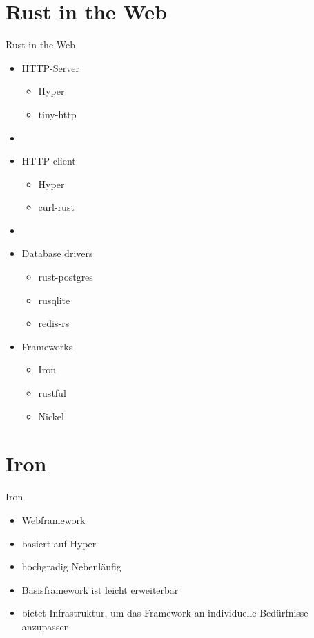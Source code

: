 \documentclass{beamer}
\begin{document}
\section{Rust in the Web}

\begin{frame}{Rust in the Web}

\begin{minipage}[t]{.45\textwidth}
\begin{itemize}
  \item HTTP-Server
  \begin{itemize}
    \item Hyper
    \item tiny-http
  \end{itemize}
  \item []
  \item HTTP client
  \begin{itemize}
    \item Hyper
    \item curl-rust
  \end{itemize} 
  \item []
  \item Database drivers
  \begin{itemize}
    \item rust-postgres
    \item rusqlite
    \item redis-rs
  \end{itemize}
\end{itemize}
\end{minipage}
\hfill
\begin{minipage}[t]{.45\textwidth}
\begin{itemize}
\item Frameworks
  \begin{itemize}
    \item Iron
    \item rustful
    \item Nickel
  \end{itemize}  
\end{itemize}
\end{minipage}

\end{frame}

\section{Iron}
\begin{frame}{Iron}
\begin{itemize}
    \item Webframework
    \item basiert auf Hyper
    \item hochgradig Nebenläufig
    \item Basisframework ist leicht erweiterbar
    \item bietet Infrastruktur, um das Framework an individuelle Bedürfnisse anzupassen
\end{itemize}

\end{frame}
\end{document}
